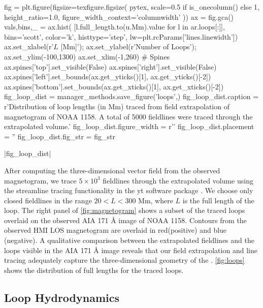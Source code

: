 \begin{pycode}
fig = plt.figure(figsize=texfigure.figsize(
    pytex,
    scale=0.5 if is_onecolumn() else 1,
    height_ratio=1.0,
    figure_width_context='columnwidth'
))
ax = fig.gca()
vals,bins,_ = ax.hist(
    [l.full_length.to(u.Mm).value for l in ar.loops[:]],
    bins='scott', color='k', histtype='step', lw=plt.rcParams['lines.linewidth'])
ax.set_xlabel(r'$L$ [Mm]');
ax.set_ylabel(r'Number of Loops');
ax.set_ylim(-100,1300)
ax.set_xlim(-1,260)
# Spines
ax.spines['top'].set_visible(False)
ax.spines['right'].set_visible(False)
ax.spines['left'].set_bounds(ax.get_yticks()[1], ax.get_yticks()[-2])
ax.spines['bottom'].set_bounds(ax.get_xticks()[1], ax.get_xticks()[-2])
fig_loop_dist = manager_methods.save_figure('loops',)
fig_loop_dist.caption = r'Distribution of loop lengths (in Mm) traced from field extrapolation of magnetogram of NOAA 1158. A total of 5000 fieldlines were traced through the extrapolated volume.'
fig_loop_dist.figure_width = r'\columnwidth'
fig_loop_dist.placement = ''
fig_loop_dist.fig_str = fig_str
\end{pycode}
|fig_loop_dist|

After computing the three-dimensional vector field from the observed magnetogram, we trace $5\times10^3$ fieldlines through the extrapolated volume using the streamline tracing functionality in the yt software package \citep{turk_yt_2011}. We choose only closed fieldlines in the range $20<L<300$ Mm, where $L$ is the full length of the loop. The right panel of \autoref{fig:magnetogram} shows a subset of the traced loops overlaid on the observed AIA 171 \AA{} image of NOAA 1158. Contours from the observed HMI LOS magnetogram are overlaid in red(positive) and blue (negative). A qualitative comparison between the extrapolated fieldlines and the loops visible in the AIA 171 \AA{} image reveals that our field extrapolation and line tracing adequately capture the three-dimensional geometry of the \AR{}. \autoref{fig:loops} shows the distribution of full lengths for the traced loops.

\subsection{Loop Hydrodynamics}\label{loops}

